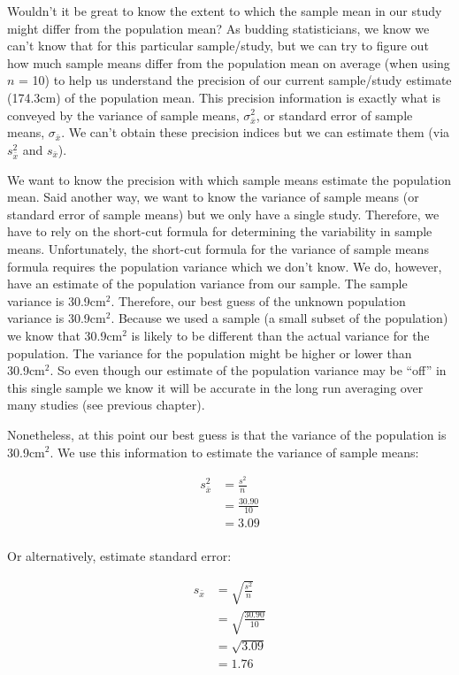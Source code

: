 \documentclass[
]{krantz}
\begin{document}
Wouldn't it be great to know the extent to which the sample mean in our study might differ from the population mean? As budding statisticians, we know we can't know that for this particular sample/study, but we can try to figure out how much sample means differ from the population mean on average (when using \(n\) = 10) to help us understand the precision of our current sample/study estimate (174.3cm) of the population mean. This precision information is exactly what is conveyed by the variance of sample means, \(\sigma_{\bar{x}}^2\), or standard error of sample means, \(\sigma_{\bar{x}}\). We can't obtain these precision indices but we can estimate them (via \(s_{\bar{x}}^2\) and \(s_{\bar{x}}\)).

We want to know the precision with which sample means estimate the population mean. Said another way, we want to know the variance of sample means (or standard error of sample means) but we only have a single study. Therefore, we have to rely on the short-cut formula for determining the variability in sample means. Unfortunately, the short-cut formula for the variance of sample means formula requires the population variance which we don't know. We do, however, have an estimate of the population variance from our sample. The sample variance is 30.9cm\(^2\). Therefore, our best guess of the unknown population variance is 30.9cm\(^2\). Because we used a sample (a small subset of the population) we know that 30.9cm\(^2\) is likely to be different than the actual variance for the population. The variance for the population might be higher or lower than 30.9cm\(^2\). So even though our estimate of the population variance may be ``off'' in this single sample we know it will be accurate in the long run averaging over many studies (see previous chapter).

Nonetheless, at this point our best guess is that the variance of the population is 30.9cm\(^2\). We use this information to estimate the variance of sample means:

\[
\begin{aligned} 
s^2_{\bar{x}} &= \frac{s^2}{n} \\
&= \frac{30.90}{10} \\
&= 3.09 \\
\end{aligned} 
\]

Or alternatively, estimate standard error:

\[
\begin{aligned} 
s_{\bar{x}} &= \sqrt{\frac{s^2}{n}} \\
&= \sqrt{\frac{30.90}{10}} \\
&= \sqrt{3.09} \\
&= 1.76 \\
\end{aligned} 
\]
\end{document}

